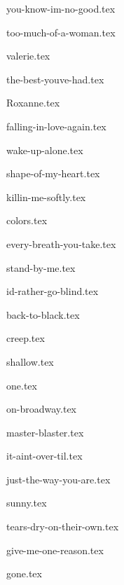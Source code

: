 \begin{songs}{}

  {you-know-im-no-good.tex}
  \sclearpage

  {too-much-of-a-woman.tex}
  \sclearpage

  {valerie.tex}
  \sclearpage
  
  {the-best-youve-had.tex}
  \sclearpage

  {Roxanne.tex}
  \sclearpage
  
  {falling-in-love-again.tex}  
  \sclearpage

  {wake-up-alone.tex}
  \sclearpage

  {shape-of-my-heart.tex}
  \sclearpage
  
  {killin-me-softly.tex}
  \sclearpage
  
  {colors.tex}
  \sclearpage
  
  {every-breath-you-take.tex}
  \sclearpage

  {stand-by-me.tex}
  \sclearpage
  

  {id-rather-go-blind.tex}  
  \sclearpage

  {back-to-black.tex}
  \sclearpage
  
  {creep.tex}
  \sclearpage
      
  {shallow.tex}
  \sclearpage

  {one.tex}
  \sclearpage  

  {on-broadway.tex}
  \sclearpage  
  
  {master-blaster.tex}
  \sclearpage  
  
  {it-aint-over-til.tex}
  \sclearpage  
  
  {just-the-way-you-are.tex}
  \sclearpage  
  
  {sunny.tex}
  \sclearpage  
  
  {tears-dry-on-their-own.tex}
  \sclearpage  
  
  {give-me-one-reason.tex}
  \sclearpage
  
  {gone.tex}
  \sclearpage

 \end{songs}
